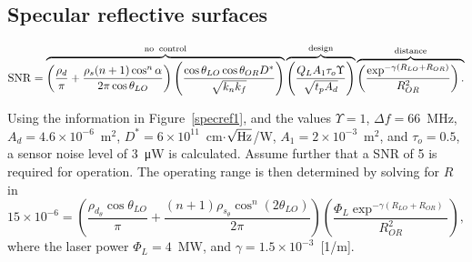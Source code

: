


\subsection{Specular reflective surfaces}

\begin{equation}
\operatorname{SNR}=
\overbrace{\left(\frac{\rho_d}{\pi} + \frac{\rho_s(n+1)\cos^n\alpha}{2\pi\cos\theta_{LO}}\right)
\left(\frac{  \cos\theta_{LO} \cos\theta_{OR} D^\ast }{\sqrt{k_nk_f}}\right)
}^{\rm no\;\;control}
\overbrace{
\left(\frac{Q_L A_1 \tau_o \Upsilon}{\sqrt{t_p A_d}}\right)
}^{\rm design}
\overbrace{
\left(\frac{\exp^{-\gamma (R_{LO}+R_{OR})} }{R^2_{OR}}\right).\\
}^{\rm distance}
\label{lrfd2e}
\end{equation}




Using the information in Figure~\ref{specref1},  and the values $\Upsilon = 1$, 
$\Delta f=66$~MHz, $A_d=4.6\times10^{-6}$~m$^2$,
$D^\ast=6\times10^{11}$~cm$\cdot$$\sqrt{\rm Hz}$/W, $A_1=2\times10^{-3}$~m$^2$,
and $\tau_o=0.5$, a sensor noise level of 3~\si{\micro\watt}{} is calculated.
Assume further that a SNR of 5 is required for
operation. The operating range is then determined by solving for $R$ in
\begin{equation}
15\times 10^{-6} = \left(
\frac{\rho_{d_\theta}\cos \theta_{LO}}{\pi}+
\frac{(n+1)\rho_{s_\theta}\cos^n (2\theta_{LO})}{2\pi}
\right)
\left(\frac{
\Phi_L \exp^{-\gamma (R_{LO}+R_{OR})}}{ R^2_{OR} }
\right),
\label{lrfi5}
\end{equation}
where the laser power $\Phi_L=4$~MW, and $\gamma=1.5\times10^{-3}$~[1/m].

